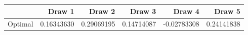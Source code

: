 \begin{tabular}{lrrrrr}
\toprule
 & Draw 1 & Draw 2 & Draw 3 & Draw 4 & Draw 5 \\
\midrule
Optimal & 0.16343630 & 0.29069195 & 0.14714087 & -0.02783308 & 0.24141838 \\
\bottomrule
\end{tabular}
